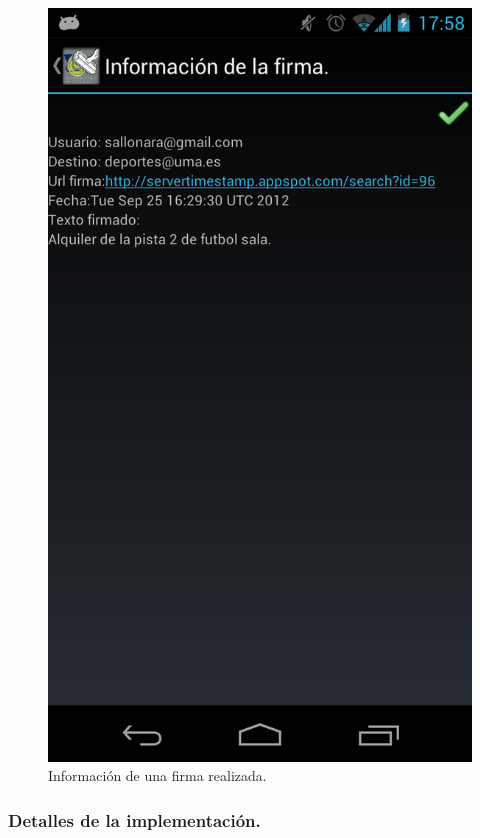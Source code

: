 \begin{figure}
  \centering
    \includegraphics[scale=0.2]{./Android/imagenes/informacionFirma.png}
  \caption{Información de una firma realizada.}
  \label{fig:informacionFirma}
\end{figure}

\subsubsection{Detalles de la implementación.}

